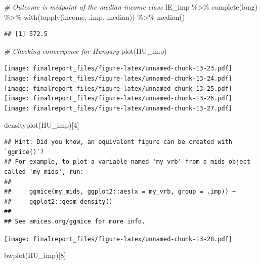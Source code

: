 \documentclass[
]{article}
\newenvironment{Shaded}{\begin{snugshade}}{\end{snugshade}}
\newcommand{\CommentTok}[1]{\textcolor[rgb]{0.56,0.35,0.01}{\textit{#1}}}
\newcommand{\DecValTok}[1]{\textcolor[rgb]{0.00,0.00,0.81}{#1}}
\newcommand{\FunctionTok}[1]{\textcolor[rgb]{0.00,0.00,0.00}{#1}}
\newcommand{\NormalTok}[1]{#1}
\newcommand{\SpecialCharTok}[1]{\textcolor[rgb]{0.00,0.00,0.00}{#1}}
\newcommand{\StringTok}[1]{\textcolor[rgb]{0.31,0.60,0.02}{#1}}
\begin{document}
\begin{Shaded}
\begin{Highlighting}[]
\CommentTok{\# Outcome is midpoint of the median income class}
\NormalTok{IE\_imp }\SpecialCharTok{\%\textgreater{}\%} 
  \FunctionTok{complete}\NormalTok{(}\StringTok{\textquotesingle{}long\textquotesingle{}}\NormalTok{) }\SpecialCharTok{\%\textgreater{}\%} 
  \FunctionTok{with}\NormalTok{(}\FunctionTok{tapply}\NormalTok{(income, .imp, median)) }\SpecialCharTok{\%\textgreater{}\%} 
  \FunctionTok{median}\NormalTok{()}
\end{Highlighting}
\end{Shaded}

\begin{verbatim}
## [1] 572.5
\end{verbatim}

\begin{Shaded}
\begin{Highlighting}[]
\CommentTok{\# Checking convergence for Hungary}
\FunctionTok{plot}\NormalTok{(HU\_imp)}
\end{Highlighting}
\end{Shaded}

\texttt{[image: finalreport\_files/figure-latex/unnamed-chunk-13-23.pdf]}
\texttt{[image: finalreport\_files/figure-latex/unnamed-chunk-13-24.pdf]}
\texttt{[image: finalreport\_files/figure-latex/unnamed-chunk-13-25.pdf]}
\texttt{[image: finalreport\_files/figure-latex/unnamed-chunk-13-26.pdf]}
\texttt{[image: finalreport\_files/figure-latex/unnamed-chunk-13-27.pdf]}

\begin{Shaded}
\begin{Highlighting}[]
\FunctionTok{densityplot}\NormalTok{(HU\_imp)[}\DecValTok{4}\NormalTok{]}
\end{Highlighting}
\end{Shaded}

\begin{verbatim}
## Hint: Did you know, an equivalent figure can be created with `ggmice()`?
## For example, to plot a variable named 'my_vrb' from a mids object called 'my_mids', run: 
## 
##     ggmice(my_mids, ggplot2::aes(x = my_vrb, group = .imp)) +
##     ggplot2::geom_density() 
## 
## See amices.org/ggmice for more info.
\end{verbatim}

\texttt{[image: finalreport\_files/figure-latex/unnamed-chunk-13-28.pdf]}

\begin{Shaded}
\begin{Highlighting}[]
\FunctionTok{bwplot}\NormalTok{(HU\_imp)[}\DecValTok{8}\NormalTok{]}
\end{Highlighting}
\end{Shaded}
\end{document}
